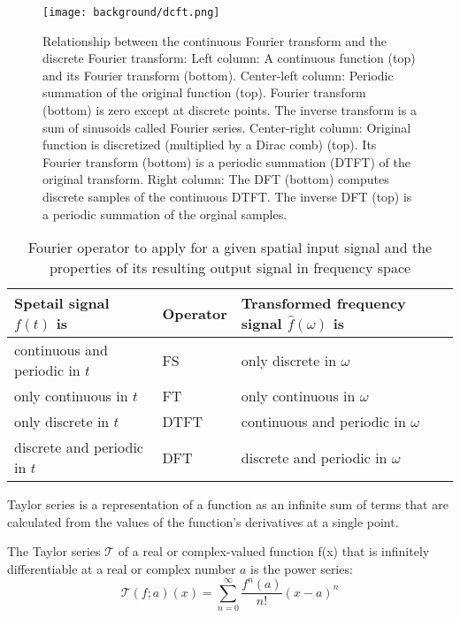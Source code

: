 \begin{figure}[H]
  \centering
  \texttt{[image: background/dcft.png]}
  \caption{Relationship between the continuous Fourier transform and the discrete Fourier transform: Left column: A continuous function (top) and its Fourier transform (bottom). Center-left column: Periodic summation of the original function (top). Fourier transform (bottom) is zero except at discrete points. The inverse transform is a sum of sinusoids called Fourier series. Center-right column: Original function is discretized (multiplied by a Dirac comb) (top). Its Fourier transform (bottom) is a periodic summation (DTFT) of the original transform. Right column: The DFT (bottom) computes discrete samples of the continuous DTFT. The inverse DFT (top) is a periodic summation of the orginal samples.}
\label{fig:contdiscft}
\end{figure}


\begin{table}[H]
    \begin{tabular}{l|l|l}
    \hline
    Spetail signal $f(t)$ is & Operator & Transformed frequency signal $\hat{f}(\omega)$ is\\
    \hline
    continuous and periodic in $t$ & FS & only discrete in $\omega$ \\
    only continuous in $t$ & FT & only continuous in $\omega$\\
    only discrete in $t$ & DTFT & continuous and periodic in $\omega$\\
    discrete and periodic in $t$ & DFT & discrete and periodic in $\omega$\\
    \hline
    \end{tabular}
\caption{Fourier operator to apply for a given spatial input signal and the properties of its resulting output signal in frequency space}
\label{tab:ftoperatorsdependencies}
\end{table}



Taylor series is a representation of a function as an infinite sum of terms that are calculated from the values of the function's derivatives at a single point.

The Taylor series $\mathcal T$ of a real or complex-valued function ƒ(x) that is infinitely differentiable at a real or complex number $a$ is the power series:
\begin{equation}
  \mathcal T(f;a)(x) = \sum_{n=0}^{\infty} \frac{f^{n}(a)}{n!}(x-a)^n
\end{equation}


